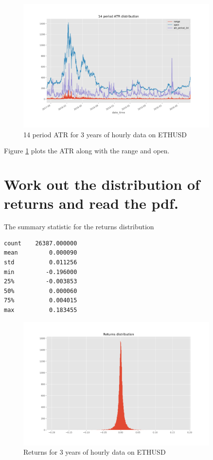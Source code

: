 \begin{figure}
\center
\includegraphics[width=0.9\textwidth]{fig/atr.png}
\caption{14 period ATR for 3 years of hourly data on ETHUSD}
\label{fig:atr}
\end{figure}
Figure \ref{fig:atr} plots the ATR along with the range and open.


\section{ Work out the distribution of returns and read the pdf.}
The summary statistic for the returns distribution
\begin{verbatim}
count    26387.000000
mean         0.000090
std          0.011256
min         -0.196000
25%         -0.003853
50%          0.000060
75%          0.004015
max          0.183455
\end{verbatim}

\begin{figure}
\center
\includegraphics[width=0.9\textwidth]{fig/ret.png}
\caption{Returns for 3 years of hourly data on ETHUSD}
\label{fig:ret}
\end{figure}


